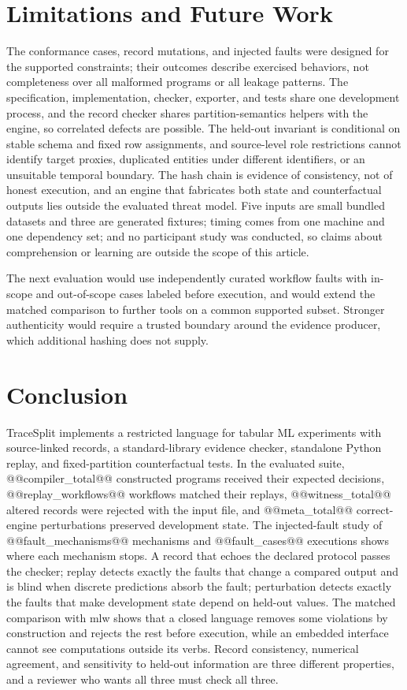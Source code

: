 \documentclass[lettersize,journal]{IEEEtran}
\newcommand{\tool}{TraceSplit}
\begin{document}
\section{Limitations and Future Work}
The conformance cases, record mutations, and injected faults were designed for the supported constraints; their outcomes describe exercised behaviors, not completeness over all malformed programs or all leakage patterns. The specification, implementation, checker, exporter, and tests share one development process, and the record checker shares partition-semantics helpers with the engine, so correlated defects are possible. The held-out invariant is conditional on stable schema and fixed row assignments, and source-level role restrictions cannot identify target proxies, duplicated entities under different identifiers, or an unsuitable temporal boundary. The hash chain is evidence of consistency, not of honest execution, and an engine that fabricates both state and counterfactual outputs lies outside the evaluated threat model. Five inputs are small bundled datasets and three are generated fixtures; timing comes from one machine and one dependency set; and no participant study was conducted, so claims about comprehension or learning are outside the scope of this article.

The next evaluation would use independently curated workflow faults with in-scope and out-of-scope cases labeled before execution, and would extend the matched comparison to further tools on a common supported subset. Stronger authenticity would require a trusted boundary around the evidence producer, which additional hashing does not supply.

\section{Conclusion}
\tool{} implements a restricted language for tabular ML experiments with source-linked records, a standard-library evidence checker, standalone Python replay, and fixed-partition counterfactual tests. In the evaluated suite, @@compiler_total@@ constructed programs received their expected decisions, @@replay_workflows@@ workflows matched their replays, @@witness_total@@ altered records were rejected with the input file, and @@meta_total@@ correct-engine perturbations preserved development state. The injected-fault study of @@fault_mechanisms@@ mechanisms and @@fault_cases@@ executions shows where each mechanism stops. A record that echoes the declared protocol passes the checker; replay detects exactly the faults that change a compared output and is blind when discrete predictions absorb the fault; perturbation detects exactly the faults that make development state depend on held-out values. The matched comparison with mlw shows that a closed language removes some violations by construction and rejects the rest before execution, while an embedded interface cannot see computations outside its verbs. Record consistency, numerical agreement, and sensitivity to held-out information are three different properties, and a reviewer who wants all three must check all three.



\end{document}
